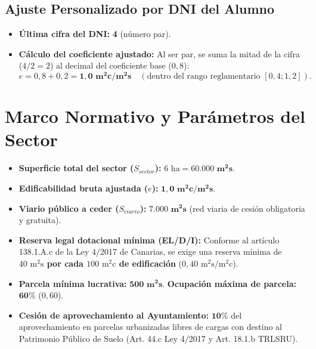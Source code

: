 \documentclass[11pt,a4paper]{article}
\begin{document}
\subsection*{Ajuste Personalizado por DNI del Alumno}
\begin{itemize}
  \item \textbf{Última cifra del DNI:} \textbf{4} (número par).
  \item \textbf{Cálculo del coeficiente ajustado:} Al ser par, se suma la mitad de la cifra ($4/2 = 2$) al decimal del coeficiente base ($0,8$):
  \[
    e = 0,8 + 0,2 = \mathbf{1,0\text{ m}^2\text{c}/\text{m}^2\text{s}} \quad (\text{dentro del rango reglamentario } [0,4 ; 1,2]).
  \]
\end{itemize}

\section{Marco Normativo y Parámetros del Sector}

\begin{itemize}
  \item \textbf{Superficie total del sector ($S_{sector}$):} $6\text{ ha} = \mathbf{60.000\text{ m}^2\text{s}}$.
  \item \textbf{Edificabilidad bruta ajustada ($e$):} $\mathbf{1,0\text{ m}^2\text{c}/\text{m}^2\text{s}}$.
  \item \textbf{Viario público a ceder ($S_{viario}$):} $\mathbf{7.000\text{ m}^2\text{s}}$ (red viaria de cesión obligatoria y gratuita).
  \item \textbf{Reserva legal dotacional mínima (EL/D/I):} Conforme al artículo 138.1.A.c de la Ley 4/2017 de Canarias, se exige una reserva mínima de \textbf{$40\text{ m}^2\text{s}$ por cada $100\text{ m}^2\text{c}$ de edificación} ($0,40\text{ m}^2\text{s}/\text{m}^2\text{c}$).
  \item \textbf{Parcela mínima lucrativa:} $\mathbf{500\text{ m}^2\text{s}}$. \quad \textbf{Ocupación máxima de parcela:} $\mathbf{60\%}$ ($0,60$).
  \item \textbf{Cesión de aprovechamiento al Ayuntamiento:} $\mathbf{10\%}$ del aprovechamiento en parcelas urbanizadas libres de cargas con destino al Patrimonio Público de Suelo (Art. 44.c Ley 4/2017 y Art. 18.1.b TRLSRU).
\end{itemize}
\end{document}
